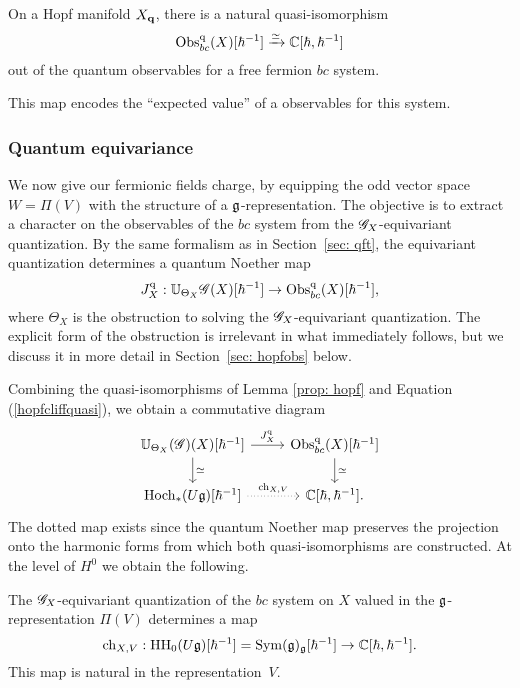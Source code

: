 \begin{lem}
On a Hopf manifold $X_{\bf q}$, there is a natural quasi-isomorphism
\[
{\rm Obs}^{\rm q}_{bc} (X) [\hbar^{-1}] \xrightarrow{\simeq} \mathbb C[\hbar,\hbar^{-1}]
\]
out of the quantum observables for a free fermion $bc$ system.
\end{lem}

This map encodes the ``expected value'' of a observables for this system.

\subsubsection{Quantum equivariance}

We now give our fermionic fields charge, by equipping the odd vector space $W = \Pi(V)$ with the structure of a  $\mathfrak g$-representation. 
The objective is to extract a character on the observables of the $bc$ system from the $\mathscr G_X$-equivariant quantization. 
By the same formalism as in Section~\ref{sec: qft}, the equivariant quantization determines a quantum Noether map
\[
J_X^{\rm q} : \mathbb U_{\Theta_X}\mathscr G(X) [\hbar^{-1}]  \to {\rm Obs}^{\rm q}_{bc}(X) [\hbar^{-1}] ,
\]
where $\Theta_X$ is the obstruction to solving the $\mathscr G_X$-equivariant quantization. 
The explicit form of the obstruction is irrelevant in what immediately follows, but we discuss it in more detail in Section~\ref{sec: hopfobs} below. 

Combining the quasi-isomorphisms of Lemma \ref{prop: hopf} and Equation (\ref{hopfcliffquasi}), we obtain a commutative diagram
\[
\begin{tikzcd}
\UU_{\Theta_X} (\sG)(X) [\hbar^{-1}]  \ar[r, "J_X^\q"] \ar[d, "\simeq"] & \Obs^\q_{bc}(X) [\hbar^{-1}] \ar[d, "\simeq"] \\
\Hoch_*(U \fg) [\hbar^{-1}] \ar[r,dotted,"{\rm ch}_{X,V}"] & \CC[\hbar,\hbar^{-1}] .
\end{tikzcd}
\] 
The dotted map exists since the quantum Noether map preserves the projection onto the harmonic forms from which both quasi-isomorphisms are constructed.
At the level of $H^0$ we obtain the following.

\begin{prop}\label{prop: twistedchar}
The $\mathscr G_X$-equivariant quantization of the $bc$ system on $X$ valued in the $\mathfrak g$-representation $\Pi(V)$ determines a map 
\[
{\rm ch}_{X,V} : {\rm HH}_0(U \mathfrak g)[\hbar^{-1}] = {\rm Sym}(\mathfrak g)_{\mathfrak g} [\hbar^{-1}] \to \mathbb C[\hbar,\hbar^{-1}] .
\] 
This map is natural in the representation~$V$.
\end{prop}

